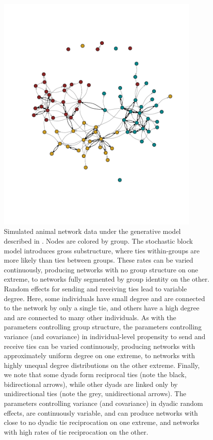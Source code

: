 \documentclass[Afour,sageh,times]{sagej}
\begin{document}
\begin{figure}[t]
\caption{Simulated animal network data under the generative model described in \citet{ross2022modelling}. Nodes are colored by group. The stochastic block model introduces gross substructure, where ties within-groups are more likely than ties between groups. These rates can be varied continuously, producing networks with no group structure on one extreme, to networks fully segmented by group identity on the other. Random effects for sending and receiving ties lead to variable degree. Here, some individuals have small degree and are connected to the network by only a single tie, and others have a high degree and are connected to many other individuals. As with the parameters controlling group structure, the parameters controlling variance (and covariance) in individual-level propensity to send and receive ties can be varied continuously, producing networks with approximately uniform degree on one extreme, to networks with highly unequal degree distributions on the other extreme. Finally, we note that some dyads form reciprocal ties (note the black, bidirectional arrows), while other dyads are linked only by unidirectional ties (note the grey, unidirectional arrows). The parameters controlling variance (and covariance) in dyadic random effects, are continuously variable, and can produce networks with close to no dyadic tie reciprocation on one extreme, and networks with high rates of tie reciprocation on the other.   }\label{examplenet}
\centering
\includegraphics[trim={0 5cm 0 4.4cm},clip,width=0.9\textwidth]{Figures/Example}
\end{figure}
\end{document}
